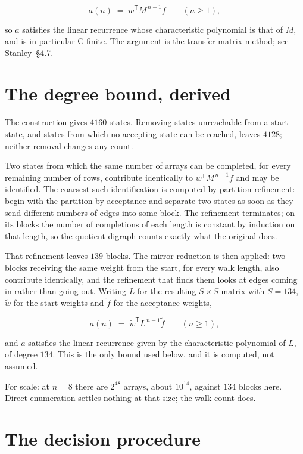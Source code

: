 \documentclass[11pt]{article}
\theoremstyle{definition}
\begin{document}
\[a(n) \;=\; w^{\mathsf T} M^{\,n-1} f \qquad (n \ge 1),\]

so $a$ satisfies the linear recurrence whose characteristic polynomial is that of $M$, and is in particular C-finite. The argument is the transfer-matrix method; see Stanley~\S4.7.

\section{The degree bound, derived}

The construction gives $4160$ states. Removing states unreachable from a start state, and states from which no accepting state can be reached, leaves $4128$; neither removal changes any count.

Two states from which the same number of arrays can be completed, for every remaining number of rows, contribute identically to $w^{\mathsf T}M^{\,n-1}f$ and may be identified. The coarsest such identification is computed by partition refinement: begin with the partition by acceptance and separate two states as soon as they send different numbers of edges into some block. The refinement terminates; on its blocks the number of completions of each length is constant by induction on that length, so the quotient digraph counts exactly what the original does.

That refinement leaves $139$ blocks. The mirror reduction is then applied: two blocks receiving the same weight from the start, for every walk length, also contribute identically, and the refinement that finds them looks at edges coming in rather than going out. Writing $L$ for the resulting $S \times S$ matrix with $S = 134$, $\tilde w$ for the start weights and $\tilde f$ for the acceptance weights,

\[a(n) \;=\; \tilde w^{\mathsf T} L^{\,n-1} \tilde f \qquad (n \ge 1),\]

and $a$ satisfies the linear recurrence given by the characteristic polynomial of $L$, of degree $134$. This is the only bound used below, and it is computed, not assumed.

For scale: at $n = 8$ there are $2^{48}$ arrays, about $10^{14}$, against $134$ blocks here. Direct enumeration settles nothing at that size; the walk count does.

\section{The decision procedure}
\end{document}
